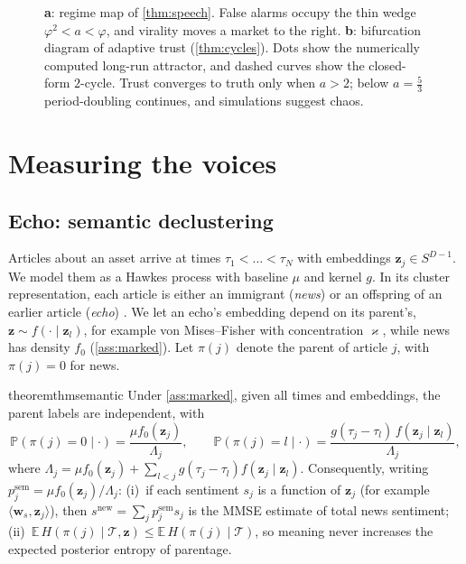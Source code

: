 \documentclass{article}
\theoremstyle{plain}
\theoremstyle{definition}
\theoremstyle{remark}
\newcommand{\E}{\mathbb{E}}
\newcommand{\Prob}{\mathbb{P}}
\newcommand{\z}{\bm{z}}
\newcommand{\w}{\bm{w}}
\begin{document}
\begin{figure}[t]
\begin{minipage}[t]{0.49\textwidth}
\end{minipage}
\caption{\textbf{a}: regime map of \cref{thm:speech}. False alarms occupy the thin wedge $\varphi^2<a<\varphi$, and virality moves a market to the right. \textbf{b}: bifurcation diagram of adaptive trust (\cref{thm:cycles}). Dots show the numerically computed long-run attractor, and dashed curves show the closed-form $2$-cycle. Trust converges to truth only when $a>2$; below $a=\frac53$ period-doubling continues, and simulations suggest chaos.}
\label{fig:theory}
\end{figure}

\section{Measuring the voices}\label{sec:measure}

\subsection{Echo: semantic declustering}\label{sec:echo}\label{sec:semantic}

Articles about an asset arrive at times $\tau_1<\dots<\tau_N$ with embeddings $\z_j\in S^{D-1}$. We model them as a Hawkes process with baseline $\mu$ and kernel $g$. In its cluster representation, each article is either an immigrant (\emph{news}) or an offspring of an earlier article (\emph{echo}) \citep{hawkesoakes1974}. We let an echo's embedding depend on its parent's, $\z\sim f(\cdot\mid\z_l)$, for example von Mises--Fisher with concentration $\varkappa$, while news has density $f_0$ (\cref{ass:marked}). Let $\pi(j)$ denote the parent of article $j$, with $\pi(j)=0$ for news.

\begin{restatable}{theorem}{thmsemantic}\label{thm:semantic}
Under \cref{ass:marked}, given all times and embeddings, the parent labels are independent, with
\[
  \Prob(\pi(j)=0\mid\cdot)=\frac{\mu f_0(\z_j)}{\Lambda_j},\qquad
  \Prob(\pi(j)=l\mid\cdot)=\frac{g(\tau_j-\tau_l)\,f(\z_j\mid\z_l)}{\Lambda_j},
\]
where $\Lambda_j=\mu f_0(\z_j)+\sum_{l<j}g(\tau_j-\tau_l)f(\z_j\mid\z_l)$. Consequently, writing $p^{\text{sem}}_j=\mu f_0(\z_j)/\Lambda_j$: (i)~if each sentiment $s_j$ is a function of $\z_j$ (for example $\langle\w_s,\z_j\rangle$), then $s^{\text{new}}=\sum_jp^{\text{sem}}_js_j$ is the MMSE estimate of total news sentiment; (ii)~$\E\,H(\pi(j)\mid\mathcal{T},\z)\le\E\,H(\pi(j)\mid\mathcal{T})$, so meaning never increases the expected posterior entropy of parentage.
\end{restatable}
\end{document}
